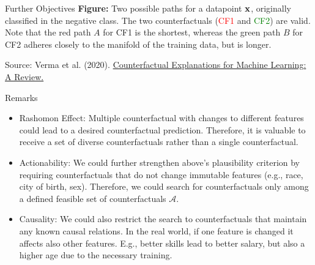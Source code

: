 \documentclass[11pt,compress,t,notes=noshow, xcolor=table]{beamer}
\begin{document}
\begin{vbframe}{Further Objectives}
\scriptsize{\textbf{Figure:} Two possible paths for a datapoint \textcolor{blue}{$\xv$},
	originally classified in the negative class. The two counterfactuals (\textcolor{red}{CF1} and \textcolor{green}{CF2}) are valid. Note that the red path $A$ for CF1 is the shortest, whereas the
	green path $B$ for CF2 adheres closely to the manifold of the training data, but is longer.}
\vspace{0.3cm}

\tiny{Source: Verma et al. (2020). \href{https://arxiv.org/pdf/2010.10596.pdf}{Counterfactual Explanations for Machine Learning: A Review.}}

\end{vbframe}

\begin{vbframe}{Remarks}
	\begin{itemize}
		\item Rashomon Effect: Multiple counterfactual with changes to different features could lead to a desired counterfactual prediction. Therefore, it is valuable to receive a set of diverse counterfactuals rather than a single counterfactual. 
		\item Actionability: We could further strengthen above's plausibility criterion by requiring counterfactuals that do not change immutable features (e.g., race, city of birth, sex). Therefore, we could  search for counterfactuals only among a defined feasible set of counterfactuals $\mathcal{A}$. 
		\item Causality: We could also restrict the search to counterfactuals that maintain any known causal relations. In the real world, if one feature is changed it affects also other features. E.g., better skills lead to better salary, but also a higher age due to the necessary training. 
	\end{itemize}
	
\end{vbframe}
\end{document}
